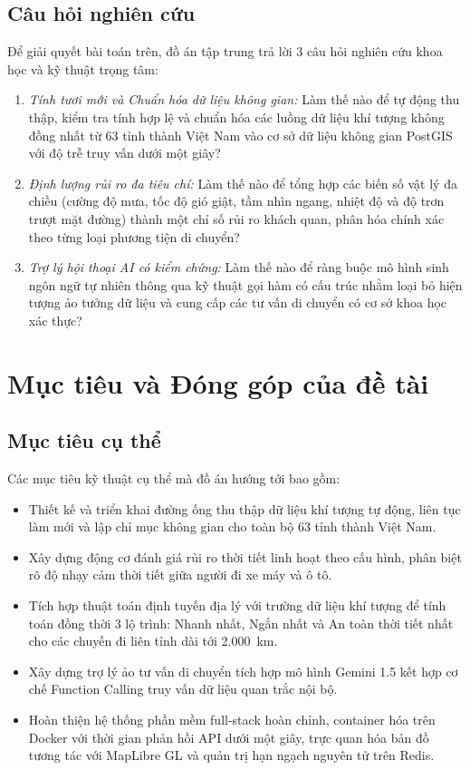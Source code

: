 \subsection{Câu hỏi nghiên cứu}
Để giải quyết bài toán trên, đồ án tập trung trả lời 3 câu hỏi nghiên cứu khoa học và kỹ thuật trọng tâm:
\begin{enumerate}[label=RQ\arabic*:]
    \item \textit{Tính tươi mới và Chuẩn hóa dữ liệu không gian:} Làm thế nào để tự động thu thập, kiểm tra tính hợp lệ và chuẩn hóa các luồng dữ liệu khí tượng không đồng nhất từ 63 tỉnh thành Việt Nam vào cơ sở dữ liệu không gian PostGIS \cite{postgis2023} với độ trễ truy vấn dưới một giây?
    \item \textit{Định lượng rủi ro đa tiêu chí:} Làm thế nào để tổng hợp các biến số vật lý đa chiều (cường độ mưa, tốc độ gió giật, tầm nhìn ngang, nhiệt độ và độ trơn trượt mặt đường) thành một chỉ số rủi ro khách quan, phân hóa chính xác theo từng loại phương tiện di chuyển?
    \item \textit{Trợ lý hội thoại AI có kiểm chứng:} Làm thế nào để ràng buộc mô hình sinh ngôn ngữ tự nhiên thông qua kỹ thuật gọi hàm có cấu trúc nhằm loại bỏ hiện tượng ảo tưởng dữ liệu và cung cấp các tư vấn di chuyển có cơ sở khoa học xác thực?
\end{enumerate}

\section{Mục tiêu và Đóng góp của đề tài}

\subsection{Mục tiêu cụ thể}
Các mục tiêu kỹ thuật cụ thể mà đồ án hướng tới bao gồm:
\begin{itemize}
    \item Thiết kế và triển khai đường ống thu thập dữ liệu khí tượng tự động, liên tục làm mới và lập chỉ mục không gian cho toàn bộ 63 tỉnh thành Việt Nam.
    \item Xây dựng động cơ đánh giá rủi ro thời tiết linh hoạt theo cấu hình, phân biệt rõ độ nhạy cảm thời tiết giữa người đi xe máy và ô tô.
    \item Tích hợp thuật toán định tuyến địa lý với trường dữ liệu khí tượng để tính toán đồng thời 3 lộ trình: Nhanh nhất, Ngắn nhất và An toàn thời tiết nhất cho các chuyến đi liên tỉnh dài tới 2.000~km.
    \item Xây dựng trợ lý ảo tư vấn di chuyển tích hợp mô hình Gemini 1.5 kết hợp cơ chế Function Calling truy vấn dữ liệu quan trắc nội bộ.
    \item Hoàn thiện hệ thống phần mềm full-stack hoàn chỉnh, container hóa trên Docker với thời gian phản hồi API dưới một giây, trực quan hóa bản đồ tương tác với MapLibre GL \cite{maplibre2024} và quản trị hạn ngạch nguyên tử trên Redis.
\end{itemize}

